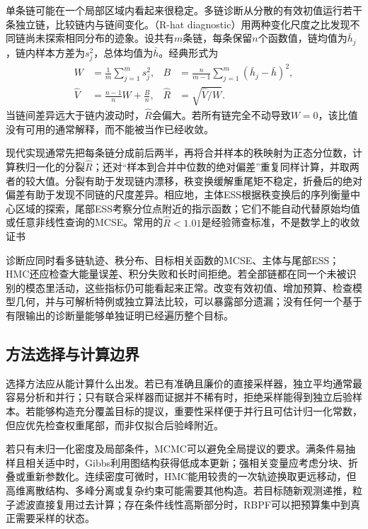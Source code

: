 单条链可能在一个局部区域内看起来很稳定。多链诊断从分散的有效初值运行若干条独立链，比较链内与链间变化。（R-hat diagnostic）用两种变化尺度之比发现不同链尚未探索相同分布的迹象。设共有$m$条链，每条保留$n$个函数值，链均值为$\bar h_j$，链内样本方差为$s_j^2$，总体均值为$\bar h$。经典形式为
\begin{equation}
  \begin{aligned}
    W&=\frac1m\sum_{j=1}^{m}s_j^2,&
    B&=\frac{n}{m-1}\sum_{j=1}^{m}(\bar h_j-\bar h)^2,\\
    \widehat V&=\frac{n-1}{n}W+\frac{B}{n},&
    \widehat R&=\sqrt{\widehat V/W}.
  \end{aligned}
  \label{eq:pgm-sampling-rhat}
\end{equation}
当链间差异远大于链内波动时，$\widehat R$会偏大。若所有链完全不动导致$W=0$，该比值没有可用的通常解释，而不能被当作已经收敛。

现代实现通常先把每条链分成前后两半，再将合并样本的秩映射为正态分位数，计算秩归一化的分裂$\widehat R$；还对“样本到合并中位数的绝对偏差”重复同样计算，并取两者的较大值。分裂有助于发现链内漂移，秩变换缓解重尾矩不稳定，折叠后的绝对偏差有助于发现不同链的尺度差异。相应地，主体ESS根据秩变换后的序列衡量中心区域的探索，尾部ESS考察分位点附近的指示函数；它们不能自动代替原始均值或任意非线性查询的MCSE。常用的$\widehat R<1.01$是经验筛查标准，不是数学上的收敛证书

诊断应同时看多链轨迹、秩分布、目标相关函数的MCSE、主体与尾部ESS；HMC还应检查大能量误差、积分失败和长时间拒绝。若全部链都在同一个未被识别的模态里活动，这些指标仍可能看起来正常。改变有效初值、增加预算、检查模型几何，并与可解析特例或独立算法比较，可以暴露部分遗漏；没有任何一个基于有限输出的诊断量能够单独证明已经遍历整个目标。

\subsection{方法选择与计算边界}
\label{sec:pgm-sampling-choice}

选择方法应从能计算什么出发。若已有准确且廉价的直接采样器，独立平均通常最容易分析和并行；只有联合采样器而证据并不稀有时，拒绝采样能得到独立后验样本。若能够构造充分覆盖目标的提议，重要性采样便于并行且可估计归一化常数，但应优先检查权重尾部，而非仅拟合后验峰附近。

若只有未归一化密度及局部条件，MCMC可以避免全局提议的要求。满条件易抽样且相关适中时，Gibbs利用图结构获得低成本更新；强相关变量应考虑分块、折叠或重新参数化。连续密度可微时，HMC能用较贵的一次轨迹换取更远移动，但高维离散结构、多峰分离或复杂约束可能需要其他构造。若目标随新观测递推，粒子滤波直接复用过去计算；存在条件线性高斯部分时，RBPF可以把预算集中到真正需要采样的状态。

